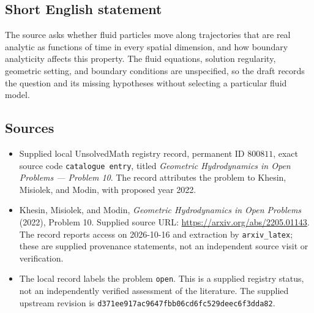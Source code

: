 \documentclass[11pt]{article}
\begin{document}
\subsection{Short English statement}
The source asks whether fluid particles move along trajectories that are real analytic as functions of time in every spatial dimension, and how boundary analyticity affects this property. The fluid equations, solution regularity, geometric setting, and boundary conditions are unspecified, so the draft records the question and its missing hypotheses without selecting a particular fluid model.
\subsection{Sources}
\begin{itemize}
\item Supplied local UnsolvedMath registry record, permanent ID \(800811\), exact source code \texttt{catalogue entry}, titled \emph{Geometric Hydrodynamics in Open Problems --- Problem 10}. The record attributes the problem to Khesin, Misiolek, and Modin, with proposed year 2022.
\item Khesin, Misiolek, and Modin, \emph{Geometric Hydrodynamics in Open Problems} (2022), Problem 10. Supplied source URL: \url{https://arxiv.org/abs/2205.01143}. The record reports access on 2026-10-16 and extraction by \texttt{arxiv\_latex}; these are supplied provenance statements, not an independent source visit or verification.
\item The local record labels the problem \texttt{open}. This is a supplied registry status, not an independently verified assessment of the literature. The supplied upstream revision is \texttt{d371ee917ac9647fbb06cd6fc529deec6f3dda82}.
\end{itemize}
\end{document}
